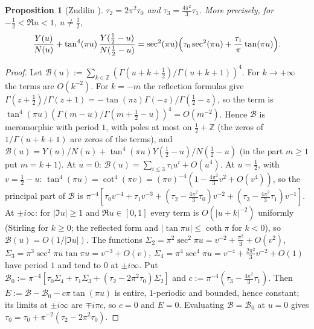 \documentclass[11pt]{amsart}
\newtheorem{proposition}[theorem]{Proposition}
\theoremstyle{definition}
\theoremstyle{remark}
\numberwithin{equation}{section}
\newcommand{\Z}{\mathbb{Z}}
\begin{document}
\begin{proposition}[Zudilin \cite{Zud}]\label{prop:bilateral}
$\tau_2=2\pi^2\tau_0$ and $\tau_3=\frac{4\pi^2}3\tau_1$. More precisely, for $-\frac12<\Re u<1$, $u\neq\frac12$,
\[
\frac{Y(u)}{N(u)}+\tan^4(\pi u)\,\frac{Y(\frac12-u)}{N(\frac12-u)}=\sec^2(\pi u)\Bigl(\tau_0\sec^2(\pi u)+\frac{\tau_1}\pi\tan(\pi u)\Bigr).
\]
\end{proposition}
\begin{proof}
Let $\mathcal B(u):=\sum_{k\in\Z}(\Gamma(u+k+\frac12)/\Gamma(u+k+1))^4$. For $k\to+\infty$ the terms are $O(k^{-2})$. For $k=-m$ the reflection formulas give $\Gamma(z+\frac12)/\Gamma(z+1)=-\tan(\pi z)\Gamma(-z)/\Gamma(\frac12-z)$, so the term is $\tan^4(\pi u)(\Gamma(m-u)/\Gamma(m+\frac12-u))^4=O(m^{-2})$. Hence $\mathcal B$ is meromorphic with period $1$, with poles at most on $\frac12+\Z$ (the zeros of $1/\Gamma(u+k+1)$ are zeros of the terms), and $\mathcal B(u)=Y(u)/N(u)+\tan^4(\pi u)Y(\frac12-u)/N(\frac12-u)$ (in the part $m\ge1$ put $m=k+1$).
At $u=0$: $\mathcal B(u)=\sum_{i\le3}\tau_iu^i+O(u^4)$. At $u=\frac12$, with $v=\frac12-u$: $\tan^4(\pi u)=\cot^4(\pi v)=(\pi v)^{-4}(1-\frac{4\pi^2}3v^2+O(v^4))$, so the principal part of $\mathcal B$ is $\pi^{-4}[\tau_0v^{-4}+\tau_1v^{-3}+(\tau_2-\frac{4\pi^2}3\tau_0)v^{-2}+(\tau_3-\frac{4\pi^2}3\tau_1)v^{-1}]$. At $\pm i\infty$: for $|\Im u|\ge1$ and $\Re u\in[0,1]$ every term is $O(|u+k|^{-2})$ uniformly (Stirling for $k\ge0$; the reflected form and $|\tan\pi u|\le\coth\pi$ for $k<0$), so $\mathcal B(u)=O(1/|\Im u|)$.
The functions $\Sigma_2=\pi^2\sec^2\pi u=v^{-2}+\frac{\pi^2}3+O(v^2)$, $\Sigma_3=\pi^3\sec^2\pi u\tan\pi u=v^{-3}+O(v)$, $\Sigma_4=\pi^4\sec^4\pi u=v^{-4}+\frac{2\pi^2}3v^{-2}+O(1)$ have period $1$ and tend to $0$ at $\pm i\infty$. Put $\mathcal B_0:=\pi^{-4}[\tau_0\Sigma_4+\tau_1\Sigma_3+(\tau_2-2\pi^2\tau_0)\Sigma_2]$ and $c:=\pi^{-4}(\tau_3-\frac{4\pi^2}3\tau_1)$. Then $E:=\mathcal B-\mathcal B_0-c\pi\tan(\pi u)$ is entire, $1$-periodic and bounded, hence constant; its limits at $\pm i\infty$ are $\mp i\pi c$, so $c=0$ and $E=0$. Evaluating $\mathcal B=\mathcal B_0$ at $u=0$ gives $\tau_0=\tau_0+\pi^{-2}(\tau_2-2\pi^2\tau_0)$.
\end{proof}
\end{document}
